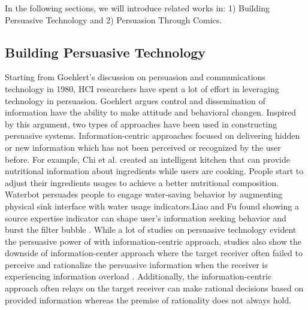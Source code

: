 
In the following sections, we will introduce related works in: 1) Building Persuasive Technology and 2) Persuasion Through Comics.

\subsection{Building Persuasive Technology}
Starting from Goehlert's discussion on persuasion and communications technology in 1980, HCI researchers have spent a lot of effort in leveraging technology in persuasion\cite{goehlert1980information}. Goehlert argues control and dissemination of information have the ability to make attitude and behavioral changen\cite{goehlert1980information}. Inspired by this argument, two types of approaches have been used in constructing persuasive systems. Information-centric approaches focused on delivering hidden or new information which has not been perceived or recognized by the user before\cite{LeeKF11}. For example, Chi et al. created an intelligent kitchen that can provide nutritional information about ingredients while users are cooking\cite{chi2007enabling}. People start to adjust their ingredients usages to achieve a better nutritional composition. Waterbot persuades people to engage water-saving behavior by augmenting physical sink interface with water usage indicators\cite{arroyo2005waterbot}.Liao and Fu found showing a source expertise indicator can shape user's information seeking behavior and burst the filter bubble \cite{liao2014expert}. While a lot of studies on persuasive technology evident the persuasive power of with information-centric approach, studies also show the downside of information-center approach where the target receiver often failed to perceive and rationalize the persuasive information when the receiver is experiencing information overload \cite{goehlert1980information,LeeKF11}. Additionally, the information-centric approach often relays on the target receiver can make rational decisions based on provided information whereas the premise of rationality does not always hold.

